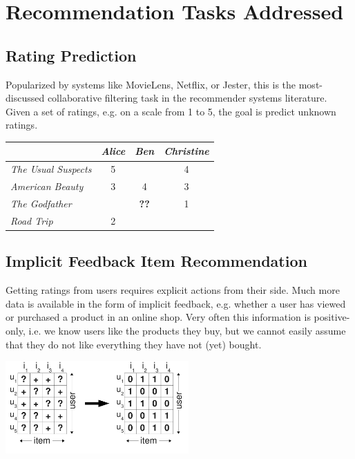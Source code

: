 \documentclass[a4paper, foldmark, 12pt]{leaflet}
\newcommand{\UserI}{\textit{Alice}}
\newcommand{\UserII}{\textit{Ben}}
\newcommand{\UserIII}{\textit{Christine}}
\newcommand{\MovieI}{\textit{The Usual Suspects}}
\newcommand{\MovieII}{\textit{American Beauty}}
\newcommand{\MovieIII}{\textit{The Godfather}}
\newcommand{\MovieIV}{\textit{Road Trip}}
\begin{document}
\newpage

\section{Recommendation Tasks Addressed}

\subsection{Rating Prediction}

Popularized by systems like MovieLens, Netflix, or Jester,
this is the most-discussed collaborative filtering task in the
recommender systems literature.
Given a set of ratings, e.g. on a scale from 1 to 5,
the goal is predict unknown ratings.

\begin{center}
      \begin{tabular}{|l||c|c|c|}
        \hline
	           & \UserI & \UserII & \UserIII \\ \hline
	\hline
	\MovieI    &  5   &     & 4     \\ \hline
	\MovieII   &  3   & 4   & 3    \\ \hline
	\MovieIII  &      & \textbf{??}    & 1    \\ \hline
	\MovieIV   &  2   &     &        \\ \hline
      \end{tabular}
\end{center}


\subsection{Implicit Feedback Item Recommendation}

Getting ratings from users requires explicit actions from their side.
Much more data is available in the form of implicit feedback,
e.g. whether a user has viewed or purchased a product in an online shop.
Very often this information is positive-only,
i.e. we know users like the products they buy, but we cannot easily assume
that they do not like everything they have not (yet) bought.

\begin{center}
	\includegraphics[width=7.0cm]{fig/interpretation_single.pdf}
\end{center}
\end{document}
